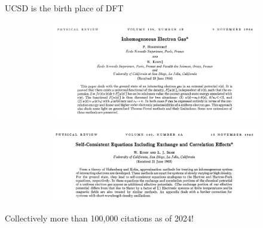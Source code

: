 \documentclass[aspectratio=169]{beamer}
\begin{document}
\begin{frame}{UCSD is the birth place of DFT}
    \begin{figure}
        \centering
        \begin{subfigure}{0.45\textwidth}
        \includegraphics[width=\linewidth]{lectures/figures/5_DFT_paper1.png}
        \end{subfigure}
        \begin{subfigure}{0.45\textwidth}
        \includegraphics[width=\linewidth]{lectures/figures/5_DFT_paper2.png}
        \end{subfigure}
    \end{figure}
    Collectively more than 100,000 citations as of 2024!
\end{frame}
\end{document}
